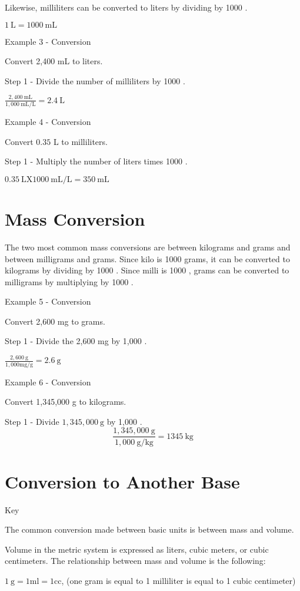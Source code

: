 Likewise, milliliters can be converted to liters by dividing by 1000 .

$1 \mathrm{~L}=1000 \mathrm{~mL}$

Example 3 - Conversion

Convert 2,400 mL to liters.

Step 1 - Divide the number of milliliters by 1000 .

$\frac{2,400 \mathrm{~mL}}{1,000 \mathrm{~mL} / \mathrm{L}}=2.4 \mathrm{~L}$

Example 4 - Conversion

Convert $0.35$ L to milliliters.

Step 1 - Multiply the number of liters times 1000 .

$0.35 \mathrm{~L} \mathrm{X} 1000 \mathrm{~mL} / \mathrm{L}=350 \mathrm{~mL}$

\section{Mass Conversion}
The two most common mass conversions are between kilograms and grams and between milligrams and grams. Since kilo is 1000 grams, it can be converted to kilograms by dividing by 1000 . Since milli is 1000 , grams can be converted to milligrams by multiplying by 1000 .

Example 5 - Conversion

Convert 2,600 mg to grams.

Step 1 - Divide the 2,600 mg by 1,000 .

$\frac{2,600 \mathrm{~g}}{1,000 \mathrm{mg} / \mathrm{g}}=2.6 \mathrm{~g}$

Example 6 - Conversion

Convert 1,345,000 g to kilograms.

Step 1 - Divide $1,345,000 \mathrm{~g}$ by 1,000 .
$$
\frac{1,345,000 \mathrm{~g}}{1,000 \mathrm{~g} / \mathrm{kg}}=1345 \mathrm{~kg}
$$

\section{Conversion to Another Base}
Key

The common conversion made between basic units is between mass and volume.

Volume in the metric system is expressed as liters, cubic meters, or cubic centimeters. The relationship between mass and volume is the following:

$1 \mathrm{~g}=1 \mathrm{ml}=1 \mathrm{cc}$, (one gram is equal to 1 milliliter is equal to 1 cubic centimeter)

